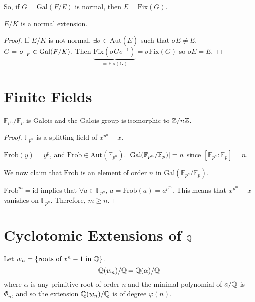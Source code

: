 \documentclass[a4paper,twoside,master.tex]{subfiles}
\begin{document}
So, if $ G = \text{Gal}(F/E) $ is normal, then $ E = \text{Fix}(G) $.
\begin{claim}
    $ E/K $ is a normal extension.
\end{claim}
\begin{proof}
    If $ E/K $ is not normal, $ \exists \sigma \in \text{Aut}(\bar{E}) $ such that $ \sigma E \neq E $. $ G = \eval{\sigma}_{F} \in \text{Gal}(F/K) $. Then $ \underbrace{\text{Fix}(\sigma G \sigma^{-1})}_{= \text{Fix}(G)} = \sigma \text{Fix}(G) $ so $ \sigma E = E $.
\end{proof}

\section{Finite Fields}\label{sec:finite_fields}

\begin{claim}
    $ \mathbb{F}_{p^n} / \mathbb{F}_p $ is Galois and the Galois group is isomorphic to $ \mathbb{Z}/n\mathbb{Z} $.
\end{claim}
\begin{proof}
    $ \mathbb{F}_{p^n} $ is a splitting field of $ x^{p^n} - x $.

    $ \text{Frob}(y) = y^p $, and $ \text{Frob} \in \text{Aut}(\mathbb{F}_{p^n}) $. $ \abs{\text{Gal}(\mathbb{F}_{p^n} / \mathbb{F}_p)} = n $ since $ [\mathbb{F}_{p^n} \colon \mathbb{F}_p] = n $.

    We now claim that $ \text{Frob} $ is an element of order $ n $ in $ \text{Gal}(\mathbb{F}_{p^n} / \mathbb{F}_p) $.

    $ \text{Frob}^m = \text{id} $ implies that $ \forall a \in \mathbb{F}_{p^n} $, $ a = \text{Frob}(a) = a^{p^m} $. This means that $ x^{p^m} - x $ vanishes on $ \mathbb{F}_{p^n} $. Therefore, $ m \geq n $.
\end{proof}


\section{Cyclotomic Extensions of $ \mathbb{Q} $}\label{sec:cyclotomic_extensions_of_$_q_$}

Let $ w_n = \{\text{roots of } x^n - 1 \text{ in } \bar{\mathbb{Q}}\} $.
\begin{equation}
    \mathbb{Q}(w_n) / \mathbb{Q} = \mathbb{Q}(\alpha) / \mathbb{Q}
\end{equation}
where $ \alpha $ is any primitive root of order $ n $ and the minimal polynomial of $ a / \mathbb{Q} $ is $ \Phi_n $, and so the extension $ \mathbb{Q}(w_n) / \mathbb{Q} $ is of degree $ \varphi(n) $.
\end{document}
